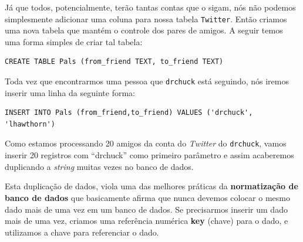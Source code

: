 
Já que todos, potencialmente, terão tantas contas que o sigam, nós não podemos
simplesmente adicionar uma coluna para nossa tabela {\tt Twitter}. Então
criamos uma nova tabela que mantém o controle dos pares de amigos. A seguir
temos uma forma simples de criar tal tabela:

\beforeverb
\begin{verbatim}
CREATE TABLE Pals (from_friend TEXT, to_friend TEXT)
\end{verbatim}
\afterverb
%
%
Toda vez que encontrarmos uma pessoa que {\tt drchuck} está seguindo, nós
iremos inserir uma linha da seguinte forma:

\beforeverb
\begin{verbatim}
INSERT INTO Pals (from_friend,to_friend) VALUES ('drchuck', 'lhawthorn')
\end{verbatim}
\afterverb
%
%
Como estamos processando 20 amigos da conta do {\it Twitter} do {\tt drchuck},
vamos inserir 20 registros com ``drchuck'' como primeiro parâmetro e assim
acaberemos duplicando a {\it string} muitas vezes no banco de dados.


Esta duplicação de dados, viola uma das melhores práticas da {\bf normatização
  de banco de dados} que basicamente afirma que nunca devemos colocar o mesmo
dado mais de uma vez em um banco de dados. Se precisarmos inserir um dado mais
de uma vez, criamos uma referência numérica {\bf key} (chave) para o dado, e
utilizamos a chave para referenciar o dado.


